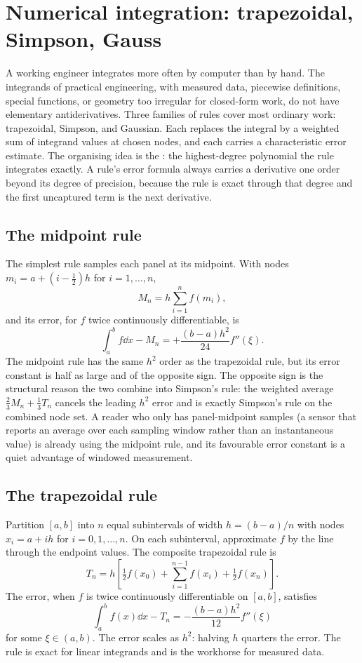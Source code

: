 \section{Numerical integration: trapezoidal, Simpson, Gauss}

A working engineer integrates more often by computer than by hand.
The integrands of practical engineering, with measured data,
piecewise definitions, special functions, or geometry too irregular
for closed-form work, do not have elementary antiderivatives. Three
families of  rules cover most ordinary work:
trapezoidal, Simpson, and Gaussian. Each replaces the integral by a
weighted sum of integrand values at chosen nodes, and each carries a
characteristic error estimate. The organising idea is the
: the highest-degree polynomial the rule
integrates exactly. A rule's error formula always carries a
derivative one order beyond its degree of precision, because the
rule is exact through that degree and the first uncaptured term is
the next derivative.

\subsection{The midpoint rule}

The simplest rule samples each panel at its midpoint. With nodes
$m_{i} = a + (i - \tfrac{1}{2})h$ for $i = 1, \ldots, n$,
\[
M_{n} = h\sum_{i=1}^{n} f(m_{i}),
\]
and its error, for $f$ twice continuously differentiable, is
\[
\int_{a}^{b} f\dd x - M_{n} = +\frac{(b-a)h^{2}}{24}f''(\xi).
\]
The midpoint rule has the same $h^{2}$ order as the trapezoidal
rule, but its error constant is half as large and of the opposite
sign. The opposite sign is the structural reason the two combine
into Simpson's rule: the weighted average $\tfrac{2}{3}M_{n} +
\tfrac{1}{3}T_{n}$ cancels the leading $h^{2}$ error and is exactly
Simpson's rule on the combined node set. A reader who only has
panel-midpoint samples (a sensor that reports an average over each
sampling window rather than an instantaneous value) is already using
the midpoint rule, and its favourable error constant is a quiet
advantage of windowed measurement.

\subsection{The trapezoidal rule}

Partition $[a,b]$ into $n$ equal subintervals of width $h = (b-a)/n$
with nodes $x_{i} = a + i h$ for $i = 0, 1, \ldots, n$. On each
subinterval, approximate $f$ by the line through the endpoint values.
The composite trapezoidal rule is
\[
T_{n} = h\left[\tfrac{1}{2} f(x_{0}) + \sum_{i=1}^{n-1} f(x_{i}) +
\tfrac{1}{2} f(x_{n})\right].
\]
The error, when $f$ is twice continuously differentiable on $[a,b]$,
satisfies
\[
\int_{a}^{b} f(x) \dd x - T_{n} = -\frac{(b-a) h^{2}}{12} f''(\xi)
\]
for some $\xi \in (a,b)$. The error scales as $h^{2}$: halving $h$
quarters the error. The rule is exact for linear integrands and is
the workhorse for measured data.


